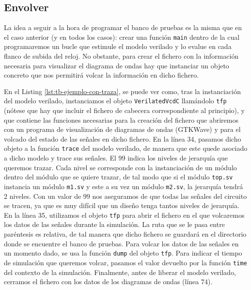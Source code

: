 \subsection{Envolver}
La idea a seguir a la hora de programar el banco de pruebas es la misma que en el caso anterior (y en todos los casos): crear una función \verb|main| dentro de la cual programaremos un bucle que estimule el modelo verilado y lo evalue en cada flanco de subida del reloj. No obstante, para crear el fichero con la información necesaria para visualizar el diagrama de ondas hay que instanciar un objeto concreto que nos permitirá volcar la información en dicho fichero. 

En el Listing \ref{lst:tb-ejemplo-con-traza}, se puede ver como, tras la instanciación del modelo verilado, instanciamos el objeto \verb|VerilatedVcdC| llamándolo \verb|tfp| (nótese que hay que incluir el fichero de cabecera correspondiente al principio), y que contiene las funciones necesarias para la creación del fichero que abriremos con un programa de visualización de diagramas de ondas (GTKWave) y para el volcado del estado de las señales en dicho fichero. En la línea 34, pasamos dicho objeto a la función \verb|trace| del modelo verilado, de manera que este quede asociado a dicho modelo y trace sus señales. El 99 indica los niveles de jerarquía que queremos trazar. Cada nivel se corresponde con la instanciación de un módulo dentro del módulo que se quiere trazar, de tal modo que si el módulo \verb|top.sv| instancia un módulo \verb|m1.sv| y este a su vez un módulo \verb|m2.sv|, la jerarquía tendrá 2 niveles. Con un valor de 99 nos aseguramos de que todas las señales del circuito se tracen, ya que es muy difícil que un diseño tenga tantos niveles de jerarquía. En la línea 35, utilizamos el objeto \verb|tfp| para abrir el fichero en el que volcaremos los datos de las señales durante la simulación. La ruta que se le pasa entre paréntesis es relativa, de tal manera que dicho fichero se guardará en el directorio donde se encuentre el banco de pruebas. Para volcar los datos de las señales en un momento dado, se usa la función \verb|dump| del objeto \verb|tfp|. Para indicar el tiempo de simulación que queremos volcar, pasamos el valor devuelto por la función \verb|time| del contexto de la simulación. Finalmente, antes de liberar el modelo verilado, cerramos el fichero con los datos de los diagramas de ondas (línea 74).

\begin{center}
	
\end{center}


